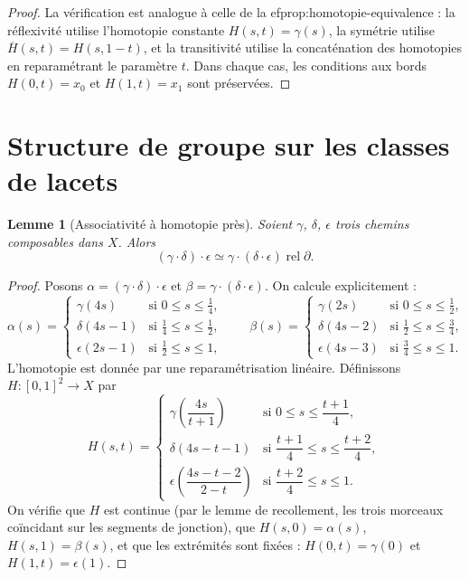 \documentclass[12pt,a4paper,openany]{book}
\theoremstyle{definition}
\theoremstyle{plain}
\newtheorem{lemme}[definition]{Lemme}
\theoremstyle{remark}
\newcommand{\rel}{\operatorname{rel}}
\begin{document}
\begin{proof}
La vérification est analogue à celle de la 
ef{prop:homotopie-equivalence} :
la réflexivité utilise l'homotopie constante $H(s,t) = \gamma(s)$, la symétrie
utilise $\overline{H}(s,t) = H(s,1-t)$, et la transitivité utilise la
concaténation des homotopies en reparamétrant le paramètre $t$. Dans chaque cas,
les conditions aux bords $H(0,t) = x_0$ et $H(1,t) = x_1$ sont préservées.
\end{proof}

\section{Structure de groupe sur les classes de lacets}\label{sec:structure-groupe}

\begin{lemme}[Associativité à homotopie près]\label{lem:associativite}
Soient $\gamma$, $\delta$, $\epsilon$ trois chemins composables dans $X$. Alors
\[
(\gamma \cdot \delta) \cdot \epsilon \simeq \gamma \cdot (\delta \cdot \epsilon) \rel \partial.
\]
\end{lemme}

\begin{proof}
Posons $\alpha = (\gamma \cdot \delta) \cdot \epsilon$ et
$\beta = \gamma \cdot (\delta \cdot \epsilon)$. On calcule explicitement :
\[
\alpha(s) = \begin{cases}
\gamma(4s) & \text{si } 0 \leqslant s \leqslant \tfrac{1}{4}, \\
\delta(4s - 1) & \text{si } \tfrac{1}{4} \leqslant s \leqslant \tfrac{1}{2}, \\
\epsilon(2s - 1) & \text{si } \tfrac{1}{2} \leqslant s \leqslant 1,
\end{cases}
\qquad
\beta(s) = \begin{cases}
\gamma(2s) & \text{si } 0 \leqslant s \leqslant \tfrac{1}{2}, \\
\delta(4s - 2) & \text{si } \tfrac{1}{2} \leqslant s \leqslant \tfrac{3}{4}, \\
\epsilon(4s - 3) & \text{si } \tfrac{3}{4} \leqslant s \leqslant 1.
\end{cases}
\]
L'homotopie est donnée par une reparamétrisation linéaire. Définissons
$H : [0,1]^2 \to X$ par
\[
H(s,t) = \begin{cases}
\gamma\!\left(\dfrac{4s}{t+1}\right) & \text{si } 0 \leqslant s \leqslant \dfrac{t+1}{4}, \\[6pt]
\delta(4s - t - 1) & \text{si } \dfrac{t+1}{4} \leqslant s \leqslant \dfrac{t+2}{4}, \\[6pt]
\epsilon\!\left(\dfrac{4s - t - 2}{2 - t}\right) & \text{si } \dfrac{t+2}{4} \leqslant s \leqslant 1.
\end{cases}
\]
On vérifie que $H$ est continue (par le lemme de recollement, les trois
morceaux coïncidant sur les segments de jonction), que $H(s,0) = \alpha(s)$,
$H(s,1) = \beta(s)$, et que les extrémités sont fixées : $H(0,t) = \gamma(0)$
et $H(1,t) = \epsilon(1)$.
\end{proof}
\end{document}

